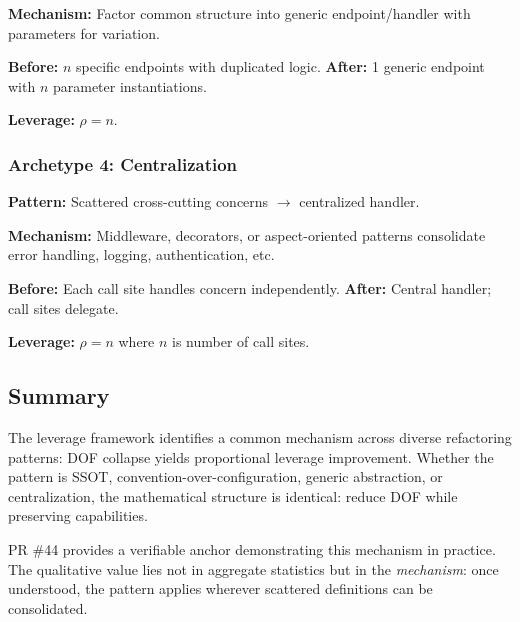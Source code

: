 \textbf{Mechanism:} Factor common structure into generic endpoint/handler
with parameters for variation.

\textbf{Before:} $n$ specific endpoints with duplicated logic.
\textbf{After:} 1 generic endpoint with $n$ parameter instantiations.

\textbf{Leverage:} $\rho = n$.

\subsubsection{Archetype 4: Centralization}

\textbf{Pattern:} Scattered cross-cutting concerns $\to$ centralized handler.

\textbf{Mechanism:} Middleware, decorators, or aspect-oriented patterns
consolidate error handling, logging, authentication, etc.

\textbf{Before:} Each call site handles concern independently.
\textbf{After:} Central handler; call sites delegate.

\textbf{Leverage:} $\rho = n$ where $n$ is number of call sites.

\subsection{Summary}

The leverage framework identifies a common mechanism across diverse
refactoring patterns: DOF collapse yields proportional leverage improvement.
Whether the pattern is SSOT, convention-over-configuration, generic
abstraction, or centralization, the mathematical structure is identical:
reduce DOF while preserving capabilities.

PR \#44 provides a verifiable anchor demonstrating this mechanism in practice.
The qualitative value lies not in aggregate statistics but in the
\emph{mechanism}: once understood, the pattern applies wherever scattered
definitions can be consolidated.

